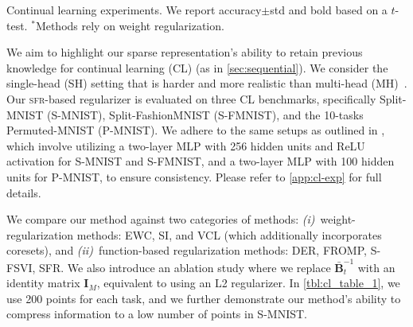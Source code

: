 \documentclass{article}
\newlength{\tblw}
\newcommand{\our}{\textsc{sfr}\xspace}
\newcommand{\mbf}[1]{\mathbf{#1}}
\newcommand{\MB}{\mbf{B}}
\newcommand{\MI}{\mbf{I}}
\begin{document}
\setlength{\columnsep}{8pt}
\setlength{\intextsep}{0pt}
\begin{wraptable}{R}{.65\textwidth}
  \centering\scriptsize
  \caption{Continual learning experiments. We report accuracy${\pm}$std and bold based on a $t$-test. $^*$Methods rely on weight regularization.}
	\label{tbl:cl_table_1}
	
	\renewcommand{\arraystretch}{1.}
	\setlength{\tabcolsep}{1pt}
	\setlength{\tblw}{0.14\textwidth}  
	
	\newcommand{\val}[2]{%
		$#1$\textcolor{gray}{\tiny ${\pm}#2$}
	} 
	
	\vspace*{-4pt}
	
	
\end{wraptable}
%
We aim to highlight our sparse representation's ability to retain previous knowledge for continual learning (CL) (as in \cref{sec:sequential}). We consider the single-head (SH) setting that is harder and more realistic than multi-head (MH)~\citep{van2019three}.	  %
%
 Our \our-based regularizer is evaluated on three CL benchmarks, specifically Split-MNIST (S-MNIST), Split-FashionMNIST (S-FMNIST), and the 10-tasks Permuted-MNIST (P-MNIST). We adhere to the same setups as outlined in \cite{rudner2022continual, pan2020continual}, which involve utilizing a two-layer MLP with 256 hidden units and ReLU activation for S-MNIST and S-FMNIST, and a two-layer MLP with 100 hidden units for P-MNIST, to ensure consistency. Please refer to \cref{app:cl-exp} for full details.


We compare our method against two categories of methods: {\em (i)}~weight-regularization methods: EWC, SI, and VCL (which additionally incorporates coresets), and {\em(ii)}~function-based regularization methods: DER, FROMP, S-FSVI, SFR. We also introduce an ablation study where we replace $\bar{\MB}_t^{-1}$ with an identity matrix $\MI_M$, equivalent to using an L2 regularizer.
In \cref{tbl:cl_table_1}, we use 200 points for each task, and we further demonstrate our method's ability to compress information to a low number of points in S-MNIST.
\end{document}
